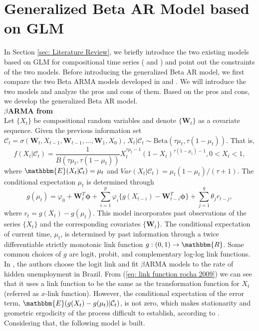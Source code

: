 \documentclass{article}
\theoremstyle{definition}
\begin{document}
\section{Generalized Beta AR Model based on GLM}
\label{sec: Model definition}
In Section \ref{sec: Literature Review}, we briefly introduce the two existing models based on GLM for compositional time series (\cite{rocha2009beta} and \cite{zheng2015generalized}) and point out the constraints of the two models. Before introducing the generalized Beta AR model, we first compare the two Beta ARMA models developed in \cite{rocha2009beta} and \cite{zheng2015generalized}. We will introduce the two models and analyze the pros and cons of them. Based on the pros and cons, we develop the generalized Beta AR model. \\
\textbf{$\beta$ARMA from \cite{rocha2009beta}} \\
Let $\{X_t\}$ be compositional random variables and denote $\{\bm{W}_t\}$ as a covariate sequence. Given the previous information set $\mathcal{C}_{t} = \sigma(\bm{W}_t,X_{t-1},\bm{W}_{t-1},...,\bm{W}_1,X_0)$, $X_t|\mathcal{C}_{t} \sim \text{Beta}(\tau \mu_t, \tau (1-\mu_t))$. That is,
\begin{equation}
\label{eq: conditional density function of X_t given C_t}
    f(X_t|\mathcal{C}_{t}) = \frac{1}{B(\tau \mu_t, \tau (1-\mu_t))}X_t^{\tau \mu_t-1}(1-X_t)^{\tau(1-\mu_t)-1}, 0<X_t<1,
\end{equation}
where $\mathbbm{E}(X_t|\mathcal{C}_t) = \mu_t$ and $Var(X_t|\mathcal{C}_t) = \mu_t(1-\mu_t)/(\tau+1).$
The conditional expectation $\mu_t$ is determined through
\begin{equation}
\label{eq: link function rocha 2009}
    g(\mu_t) = \varphi_0+ \bm{W}_t^T \bm{\phi}+ \sum_{i=1}^p \varphi_i \{g(X_{t-i})-\bm{W}_{t-i}^T \bm{\phi}\}+\sum_{j=1}^q \theta_j r_{t-j},
\end{equation}
where $r_{t} = g(X_t)-g(\mu_t).$
This model incorporates past observations of the series $\{X_t\}$ and the corresponding covariates $\{\bm{W}_t\}$. The conditional expectation of current time, $\mu_t$, is determined by past information through a twice differentiable strictly monotonic link function $g: (0,1) \rightarrow \mathbbm{R}$. Some common choices of $g$ are logit, probit, and complementary log-log link functions. In \cite{rocha2009beta}, the authors choose the logit link and fit $\beta$ARMA models to the rate of hidden unemployment in Brazil. From (\ref{eq: link function rocha 2009}) we can see that it uses a link function to be the same as the transformation function for $X_t$ (referred as $x$-link function). However, the conditional expectation of the error term, $\mathbbm{E}(g(X_t)-g(\mu_t)|\mathcal{C}_t)$, is not zero, which makes stationarity and geometric ergodicity of the process difficult to establish, according to \cite{zheng2015generalized}. Considering that, the following model is built. \\
\end{document}
